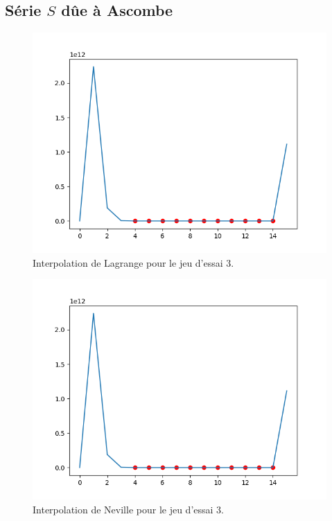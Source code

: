 \documentclass[12pt,french,titlepage]{article}
\begin{document}
	\subsection{Série $S$ dûe à Ascombe}
		\begin{figure}[H]
		\includegraphics[width=\textwidth]{"31.png"}
		\caption{Interpolation de Lagrange pour le jeu d'essai 3.}
		\end{figure}
		
		\begin{figure}[H]
		\includegraphics[width=\textwidth]{"32.png"}
		\caption{Interpolation de Neville pour le jeu d'essai 3.}
		\end{figure}
		
\end{document}
